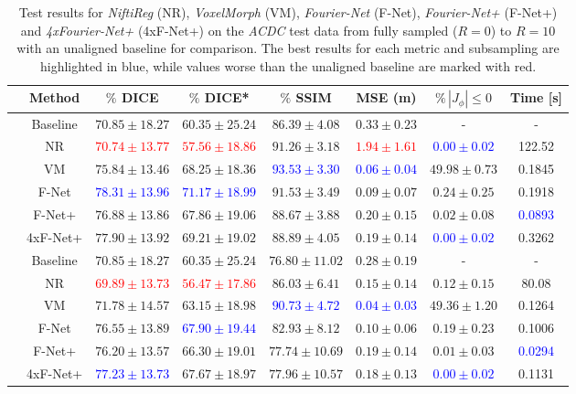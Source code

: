 \documentclass[english,version-2022-01]{uzl-thesis} %
\begin{document}
\begin{table}[h] %
	\scriptsize
	\centering
	\caption{Test results for \emph{NiftiReg} (NR), \emph{VoxelMorph} (VM), \emph{Fourier-Net} (F-Net), \emph{Fourier-Net+} (F-Net+) and \emph{4xFourier-Net+} (4xF-Net+) on the \emph{ACDC} test data from fully sampled ($R=0$) to $R=10$ with an unaligned baseline for comparison. The best results for each metric and subsampling are highlighted in blue, while values worse than the unaligned baseline are marked with red.}
	\label{tab:ComparisonSubsamplingACDC}
	\begin{tabular}{c c c c c c c c} 
		\toprule
		 & Method & $\%$ DICE & $\%$ DICE* & $\%$ SSIM & MSE (m) & $\% \, |J_{\phi}|\leq0$ & Time [s] \\
		\midrule
		\multirow{6}{*}{\rotatebox{90}{$R=0$}} & Baseline & $70.85 \pm 18.27$  & $60.35 \pm 25.24$ & $86.39 \pm 4.08$ & $0.33 \pm 0.23$ & - & -\\  
		 & NR & \textcolor{red}{$70.74 \pm 13.77$} & \textcolor{red}{$57.56 \pm 18.86$} & $91.26 \pm 3.18$ & \textcolor{red}{$1.94 \pm 1.61$} & \textcolor{blue}{$0.00 \pm 0.02$} & 122.52\\
		 & VM & $75.84 \pm 13.46$ & $68.25 \pm 18.36$ & \textcolor{blue}{$93.53 \pm 3.30$} & \textcolor{blue}{$0.06 \pm 0.04$} & $49.98 \pm 0.73$ & 0.1845\\ 
		 & F-Net & \textcolor{blue}{$78.31 \pm 13.96$} & \textcolor{blue}{$71.17 \pm 18.99$} & $91.53 \pm 3.49$ & $0.09 \pm 0.07$ & $0.24 \pm 0.25$ & 0.1918\\ 
		 & F-Net+ & $76.88 \pm 13.86$ & $67.86 \pm 19.06$ & $88.67 \pm 3.88$ & $0.20 \pm 0.15$ & $0.02 \pm 0.08$ & \textcolor{blue}{0.0893} \\ 
		 & 4xF-Net+ & $77.90 \pm 13.92$ & $69.21 \pm 19.02$  & $88.89 \pm 4.05$ & $0.19 \pm 0.14$ & \textcolor{blue}{$0.00 \pm 0.02$} & 0.3262\\ 
		 	
		\midrule
		\multirow{6}{*}{\rotatebox{90}{$R=4$}} & Baseline & $70.85 \pm 18.27$ & $60.35 \pm 25.24$ & $76.80 \pm 11.02$ & $0.28 \pm 0.19$ & - & -\\  
		 & NR & \textcolor{red}{$69.89 \pm 13.73$} & \textcolor{red}{$56.47 \pm 17.86$} & $86.03 \pm 6.41$ & $0.15 \pm 0.14$ & $ 0.12 \pm 0.15$ & 80.08 \\  
		 & VM & $71.78 \pm 14.57$ & $63.15 \pm 18.98$ & \textcolor{blue}{$90.73 \pm 4.72$} & \textcolor{blue}{$0.04 \pm 0.03$} & $49.36 \pm 1.20$ & 0.1264\\  	
		 & F-Net & $76.55 \pm 13.89$ & \textcolor{blue}{$67.90 \pm 19.44$} & $82.93 \pm 8.12$ & $0.10 \pm 0.06$ & $0.19 \pm 0.23$ & 0.1006\\ 
		 & F-Net+ & $76.20 \pm 13.57$ & $66.30 \pm 19.01$ & $77.74 \pm 10.69$ & $0.19 \pm 0.14$ & $0.01 \pm 0.03$ & \textcolor{blue}{0.0294}\\ 
		 & 4xF-Net+ & \textcolor{blue}{$77.23 \pm 13.73$} & $67.67 \pm 18.97$ & $77.96 \pm 10.57$ & $0.18 \pm 0.13$ & \textcolor{blue}{$0.00 \pm 0.02$} & 0.1131\\   
		

\end{tabular}
\end{table}
\end{document}
